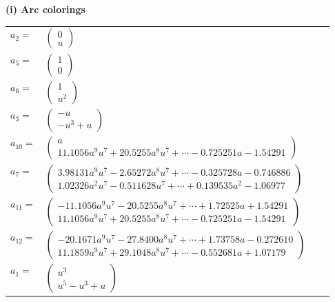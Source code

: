\documentclass[1p]{elsarticle_modified}
\theoremstyle{definition}
\begin{document}
\flushleft \textbf{(i) Arc colorings}\\
\begin{tabular}{m{7pt} m{180pt} m{7pt} m{180pt} }
\flushright $a_{2}=$&$\begin{pmatrix}0\\u\end{pmatrix}$ \\
\flushright $a_{5}=$&$\begin{pmatrix}1\\0\end{pmatrix}$ \\
\flushright $a_{6}=$&$\begin{pmatrix}1\\u^2\end{pmatrix}$ \\
\flushright $a_{3}=$&$\begin{pmatrix}- u\\- u^3+u\end{pmatrix}$ \\
\flushright $a_{10}=$&$\begin{pmatrix}a\\11.1056 a^{9} u^{7}+20.5255 a^{8} u^{7}+\cdots-0.725251 a-1.54291\end{pmatrix}$ \\
\flushright $a_{7}=$&$\begin{pmatrix}3.98131 a^{9} u^{7}-2.65272 a^{8} u^{7}+\cdots-0.325728 a-0.746886\\1.02326 a^{2} u^{7}-0.511628 u^{7}+\cdots+0.139535 a^{2}-1.06977\end{pmatrix}$ \\
\flushright $a_{11}=$&$\begin{pmatrix}-11.1056 a^{9} u^{7}-20.5255 a^{8} u^{7}+\cdots+1.72525 a+1.54291\\11.1056 a^{9} u^{7}+20.5255 a^{8} u^{7}+\cdots-0.725251 a-1.54291\end{pmatrix}$ \\
\flushright $a_{12}=$&$\begin{pmatrix}-20.1671 a^{9} u^{7}-27.8400 a^{8} u^{7}+\cdots+1.73758 a-0.272610\\11.1859 a^{9} u^{7}+29.1048 a^{8} u^{7}+\cdots-0.552681 a+1.07179\end{pmatrix}$ \\
\flushright $a_{1}=$&$\begin{pmatrix}u^3\\u^5- u^3+u\end{pmatrix}$ \\

\end{tabular}
\end{document}
